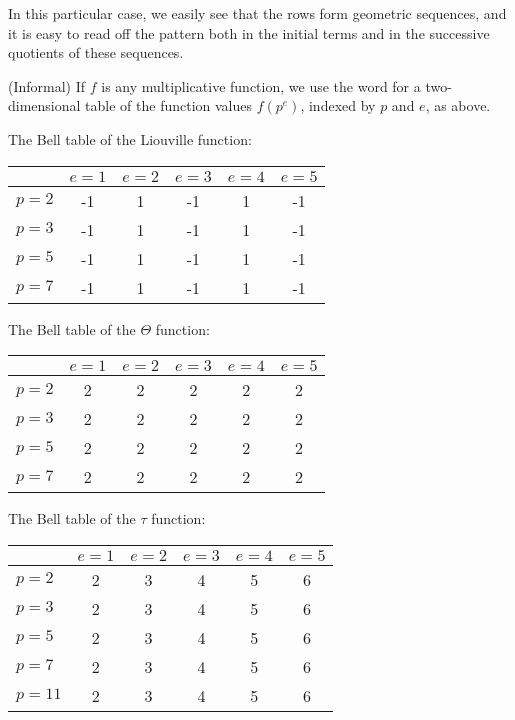 In this particular case, we easily see that the rows form geometric sequences, and it is easy to read off the pattern both in the initial terms and in the successive quotients of these sequences.

\begin{definition}
(Informal) If $f$ is any multiplicative function, we use the word  for a two-dimensional table of the function values $f(p^e)$, indexed by $p$ and $e$, as above.
\end{definition}

\begin{example}
The Bell table of the Liouville function:
\vskip10pt
\begin{center}
\begin{tabular}{| l | | c | c | c | c | c |}
\hline
& $e = 1$ & $e = 2$ & $e = 3$ & $e = 4$ & $e = 5$\\
\hline
\hline
$p = 2$ & -1 & 1 & -1 & 1 & -1 \\
\hline
$p = 3$ & -1 & 1 & -1 & 1 & -1 \\
\hline
$p = 5$ & -1 & 1 & -1 & 1 & -1 \\
\hline
$p = 7$ & -1 & 1 & -1 & 1 & -1 \\
\hline
\end{tabular}
\end{center}
\end{example}

\begin{example}
The Bell table of the $\Theta$ function:
\vskip10pt
\begin{center}
\begin{tabular}{| l | | c | c | c | c | c |}
\hline
& $e = 1$ & $e = 2$ & $e = 3$ & $e = 4$ & $e = 5$\\
\hline
\hline
$p = 2$ & 2 & 2 & 2 & 2 & 2 \\
\hline
$p = 3$ & 2 & 2 & 2 & 2 & 2 \\
\hline
$p = 5$ & 2 & 2 & 2 & 2 & 2 \\
\hline
$p = 7$ & 2 & 2 & 2 & 2 & 2 \\
\hline
\end{tabular}
\end{center}
\end{example}

\begin{example}
The Bell table of the $\tau$ function:
\vskip10pt
\begin{center}
\begin{tabular}{| l | | c | c | c | c | c |}
\hline
& $e = 1$ & $e = 2$ & $e = 3$ & $e = 4$ & $e = 5$\\
\hline
\hline
$p = 2$ & 2 & 3 & 4 & 5 & 6 \\
\hline
$p = 3$ & 2 & 3 & 4 & 5 & 6 \\
\hline
$p = 5$ & 2 & 3 & 4 & 5 & 6 \\
\hline
$p = 7$ & 2 & 3 & 4 & 5 & 6 \\
\hline
$p = 11$ & 2 & 3 & 4 & 5 & 6 \\
\hline
\end{tabular}
\end{center}
\end{example}


